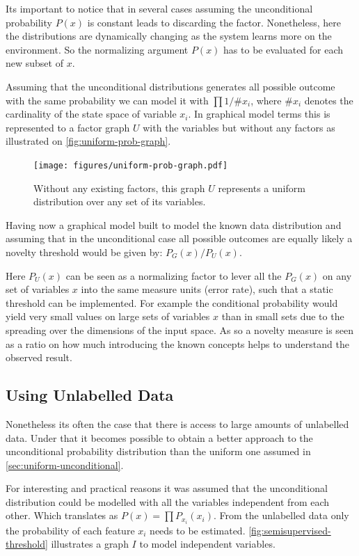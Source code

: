 \documentclass[runningheads,a4paper]{llncs}
\begin{document}
Its important to notice that in several cases assuming the unconditional probability $P(x)$
is constant leads to discarding the factor.
Nonetheless, here the distributions are dynamically changing as the system learns more on the environment.
So the normalizing argument $P(x)$ has to be evaluated for each new subset of $x$.

Assuming that the unconditional distributions generates all possible outcome with the same probability
we can model it with $\prod{1/\# x_i}$, where $\# x_i$ denotes the cardinality of the state space
of variable $x_i$.
In graphical model terms this is represented to a factor graph $U$ with the variables but
without any factors as illustrated on \autoref{fig:uniform-prob-graph}.

\begin{figure}
\centering
\texttt{[image: figures/uniform-prob-graph.pdf]}
\caption{\label{fig:uniform-prob-graph}Without any existing factors, this graph $U$ represents a
         uniform distribution over any set of its variables.}
\end{figure}

Having now a graphical model built to model the known data distribution and assuming that in the unconditional case all
possible outcomes are equally likely a novelty threshold would be given by: $P_G(x)/P_U(x)$.

Here $P_{U}(x)$ can be seen as a normalizing factor to lever all the $P_G(x)$ on any set of
variables $x$ into the same measure units (error rate), such that a static threshold can be implemented.
For example the conditional probability would yield very small values on large sets of variables
$x$ than in small sets due to the spreading over the dimensions of the input space.
As so a novelty measure is seen as a ratio on how much introducing the known concepts helps to
understand the observed result.


\subsection{Using Unlabelled Data}
Nonetheless its often the case that there is access to large amounts of unlabelled data.
Under that it becomes possible to obtain a better approach to the unconditional probability
distribution than the uniform one assumed in \autoref{sec:uniform-unconditional}.

For interesting and practical reasons it was assumed that the unconditional distribution
could be modelled with all the variables independent from each other.
Which translates as $P(x)=\prod{P_{x_i}(x_i)}$.
From the unlabelled data only the probability of each feature $x_i$ needs to be estimated.
\autoref{fig:semisupervised-threshold} illustrates a graph $I$ to model independent variables.
\end{document}
